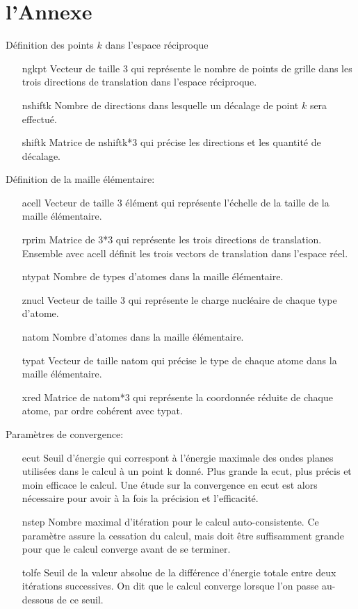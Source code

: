 \section{l'Annexe}
Définition des points $k$ dans l'espace réciproque
\begin{itemize}[leftmargin=0em, font=\bfseries]
  \item[ngkpt] Vecteur de taille 3 qui représente le nombre de points de grille dans les trois directions de translation dans l'espace réciproque.
  \item[nshiftk] Nombre de directions dans lesquelle un décalage de point $k$ sera effectué.
  \item[shiftk] Matrice de nshiftk*3 qui précise les directions et les quantité de décalage.
\end{itemize}
Définition de la maille élémentaire:
\begin{itemize}[leftmargin=0em, font=\bfseries]
  \item[acell] Vecteur de taille 3 élément qui représente l'échelle de la taille de la maille élémentaire.
  \item[rprim] Matrice de 3*3 qui représente les trois directions de translation.
    Ensemble avec acell définit les trois vectors de translation dans l'espace réel.
  \item[ntypat] Nombre de types d'atomes dans la maille élémentaire.
  \item[znucl] Vecteur de taille 3 qui représente le charge nucléaire de chaque type d'atome.
  \item[natom] Nombre d'atomes dans la maille élémentaire.
  \item[typat] Vecteur de taille natom qui précise le type de chaque atome dans la maille élémentaire.
  \item[xred] Matrice de natom*3 qui représente la coordonnée réduite de chaque atome,
    par ordre cohérent avec typat.
\end{itemize}
Paramètres de convergence:
\begin{itemize}[leftmargin=0em, font=\bfseries]
  \item[ecut] Seuil d'énergie qui correspont à l'énergie maximale des ondes planes utilisées dans le calcul à un point k donné.
    Plus grande la ecut, plus précis et moin efficace le calcul.
    Une étude sur la convergence en ecut est alors nécessaire pour avoir à la fois la précision et l'efficacité.
  \item[nstep] Nombre maximal d'itération pour le calcul auto-consistente.
    Ce paramètre assure la cessation du calcul, mais doit être suffisamment grande pour que le calcul converge avant de se terminer.
  \item[tolfe] Seuil de la valeur absolue de la différence d'énergie totale entre deux itérations successives.
    On dit que le calcul converge lorsque l'on passe au-dessous de ce seuil.
\end{itemize}
